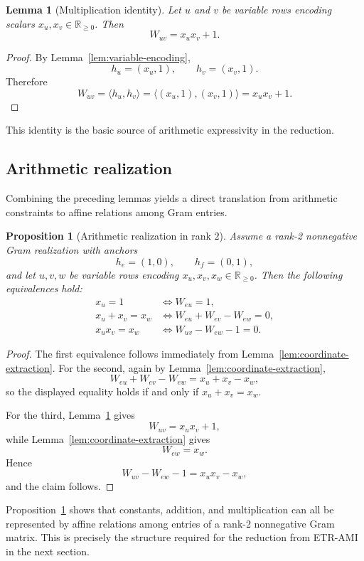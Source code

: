 \documentclass[11pt]{article}
\newtheorem{lemma}[theorem]{Lemma}
\newtheorem{proposition}[theorem]{Proposition}
\begin{document}
\begin{lemma}[Multiplication identity]
\label{lem:multiplication-identity}
Let $u$ and $v$ be variable rows encoding scalars $x_u,x_v\in\mathbb{R}_{\ge 0}$.
Then
\[
W_{uv} = x_u x_v + 1.
\]
\end{lemma}

\begin{proof}
By Lemma~\ref{lem:variable-encoding},
\[
h_u=(x_u,1),\qquad h_v=(x_v,1).
\]
Therefore
\[
W_{uv}
= \langle h_u,h_v\rangle
= \langle (x_u,1),(x_v,1)\rangle
= x_u x_v + 1.
\]
\end{proof}

This identity is the basic source of arithmetic expressivity in the reduction.

\subsection{Arithmetic realization}

Combining the preceding lemmas yields a direct translation from arithmetic
constraints to affine relations among Gram entries.

\begin{proposition}[Arithmetic realization in rank $2$]
\label{prop:arithmetic-realization}
Assume a rank-2 nonnegative Gram realization with anchors
\[
h_e=(1,0),\qquad h_f=(0,1),
\]
and let $u,v,w$ be variable rows encoding $x_u,x_v,x_w\in\mathbb{R}_{\ge 0}$.
Then the following equivalences hold:
\begin{align*}
x_u = 1
&\iff W_{eu}=1,\\[0.5ex]
x_u + x_v = x_w
&\iff W_{eu}+W_{ev}-W_{ew}=0,\\[0.5ex]
x_u x_v = x_w
&\iff W_{uv}-W_{ew}-1=0.
\end{align*}
\end{proposition}

\begin{proof}
The first equivalence follows immediately from
Lemma~\ref{lem:coordinate-extraction}. For the second, again by
Lemma~\ref{lem:coordinate-extraction},
\[
W_{eu}+W_{ev}-W_{ew}
= x_u+x_v-x_w,
\]
so the displayed equality holds if and only if $x_u+x_v=x_w$.

For the third, Lemma~\ref{lem:multiplication-identity} gives
\[
W_{uv}=x_u x_v+1,
\]
while Lemma~\ref{lem:coordinate-extraction} gives
\[
W_{ew}=x_w.
\]
Hence
\[
W_{uv}-W_{ew}-1 = x_u x_v - x_w,
\]
and the claim follows.
\end{proof}

Proposition~\ref{prop:arithmetic-realization} shows that constants,
addition, and multiplication can all be represented by affine relations among
entries of a rank-2 nonnegative Gram matrix. This is precisely the structure
required for the reduction from \textsc{ETR-AMI} in the next section.
\end{document}
